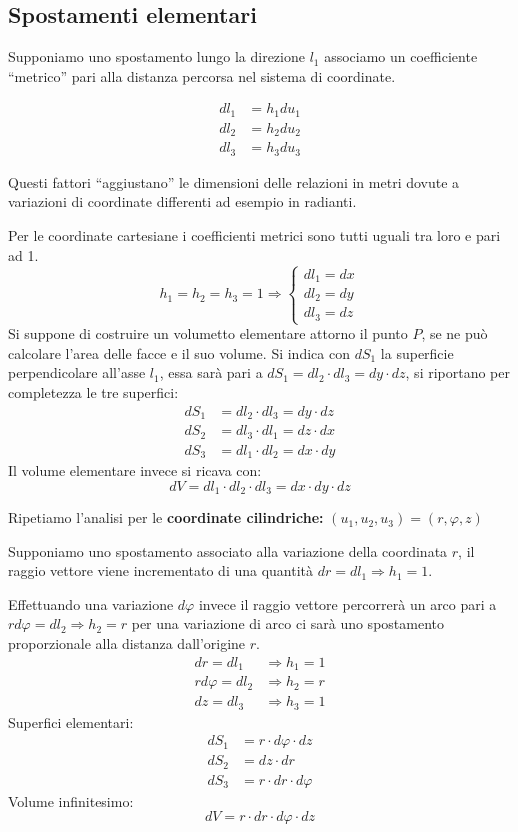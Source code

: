 \subsection{Spostamenti elementari}
Supponiamo uno spostamento lungo la direzione $l_1$ associamo un coefficiente ``metrico'' pari 
alla distanza percorsa nel sistema di coordinate.

\begin{align*}
dl_1 &= h_1 du_1 \\
dl_2 &= h_2 du_2 \\
dl_3 &= h_3 du_3
\end{align*}

Questi fattori ``aggiustano'' le dimensioni delle relazioni in metri dovute a variazioni di 
coordinate differenti ad esempio in radianti.

Per le coordinate cartesiane i coefficienti metrici sono tutti uguali tra loro e pari ad 1.
$$
h_1 = h_2 = h_3 = 1 \Rightarrow
\begin{cases}
dl_1 = dx \\
dl_2 = dy \\
dl_3 = dz
\end{cases}
$$
Si suppone di costruire un volumetto elementare attorno il punto $P$, se ne può calcolare
l'area delle facce e il suo volume.
Si indica con $dS_1$ la superficie perpendicolare all'asse $l_1$, essa sarà pari a 
$dS_1 = dl_2\cdot dl_3 = dy\cdot dz$, si riportano per completezza le tre superfici:
\begin{align*}
dS_1 &= dl_2\cdot dl_3 = dy\cdot dz \\
dS_2 &= dl_3\cdot dl_1 = dz\cdot dx \\
dS_3 &= dl_1\cdot dl_2 = dx\cdot dy
\end{align*}
Il volume elementare invece si ricava con:
$$
dV = dl_1\cdot dl_2 \cdot dl_3 = dx\cdot dy\cdot dz
$$

Ripetiamo l'analisi per le \textbf{coordinate cilindriche:}
$ (u_1,u_2,u_3) = (r,\varphi,z)$

Supponiamo uno spostamento associato alla variazione della coordinata $r$, il raggio vettore
viene incrementato di una quantità $dr = dl_1 \Rightarrow h_1 =1$.

Effettuando una variazione $d\varphi$ invece il raggio vettore percorrerà un arco pari 
a $rd\varphi = dl_2 \Rightarrow h_2 = r$ per una variazione di arco ci sarà uno 
spostamento proporzionale alla distanza dall'origine $r$.
\begin{align*}
dr = dl_1 &\Rightarrow h_1 = 1\\
r d\varphi = dl_2 &\Rightarrow h_2 = r \\
dz = dl_3 &\Rightarrow h_3 = 1
\end{align*}
Superfici elementari:
\begin{align*}
dS_1 &= r\cdot d\varphi\cdot dz\\
dS_2 &= dz\cdot dr\\
dS_3 &= r\cdot dr\cdot d\varphi
\end{align*}
Volume infinitesimo:
$$
dV = r\cdot dr\cdot d\varphi\cdot dz
$$

